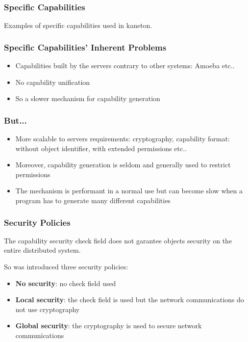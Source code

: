
\begin{frame}
  \frametitle{Specific Capabilities}

  Examples of specific capabilities used in kaneton.

  \begin{center}
  \end{center}
\end{frame}


\begin{frame}
  \frametitle{Specific Capabilities' Inherent Problems}

  \begin{itemize}[<+->]
    \item
      Capabilities built by the servers contrary to other systems:
      Amoeba etc..
    \item
      No capability unification
    \item
      So a slower mechanism for capability generation
  \end{itemize}

  \nl
\end{frame}


\begin{frame}
  \frametitle{But...}

  \begin{itemize}[<+->]
    \item
      More scalable to servers requirements: cryptography,
      capability format: without object identifier, with extended
      permissions etc..
    \item
      Moreover, capability generation is seldom and generally used
      to restrict permissions
    \item
      The mechanism is performant in a normal use but can become
      slow when a program has to generate many different capabilities
  \end{itemize}
\end{frame}


\begin{frame}
  \frametitle{Security Policies}

  The capability security check field does not garantee objects security on
  the entire distributed system.

  \nl

  So was introduced three security policies:

  \begin{itemize}[<+->]
    \item
      \textbf{No security}: no check field used
    \item
      \textbf{Local security}: the check field is used but the
      network communications do not use cryptography
    \item
      \textbf{Global security}: the cryptography is used to secure
      network communications
  \end{itemize}
\end{frame}

